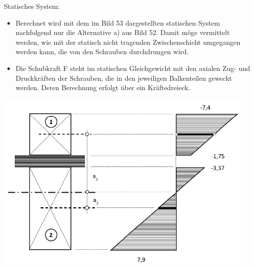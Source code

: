 \documentclass[fleqn,twoside]{article}
\begin{document}
        \begin{minipage}{0.55\textwidth}
        Statisches System:
            \begin{itemize}
                \item Berechnet wird mit dem im Bild 53 dargestellten statischen System nachfolgend nur die Alternative a) aus Bild 52. Damit möge vermittelt werden, wie mit der statisch nicht tragenden Zwischenschicht umgegangen werden kann, die von den Schrauben durchdrungen wird.
                \item Die Schubkraft F steht im statischen Gleichgewicht mit den axialen Zug- und Druckkräften der Schrauben, die in den jeweiligen Balkenteilen geweckt werden. Deren Berechnung erfolgt über ein Kräftedreieck.
            \end{itemize}
            \includegraphics[width=0.95\textwidth]{Grafiken/Denkmalpflegerische Arbeit/Reparatur von Deckenbalken Statik 2.png}
        \end{minipage}
\end{document}
